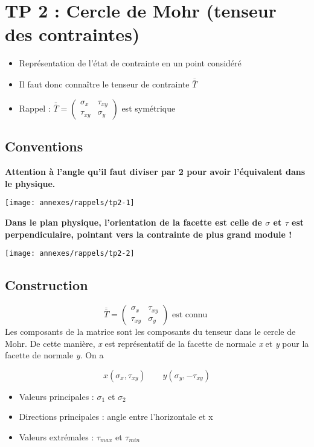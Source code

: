 
\section*{TP 2 : Cercle de Mohr (tenseur des contraintes)}
\begin{itemize}
	\item Représentation de l'état de contrainte en un point considéré
	\item Il faut donc connaître le tenseur de contrainte $\overline{\overline{T}}$
	\item Rappel : $\overline{\overline{T}} = 
	      \left(	
	      \begin{array}{cc}
	      	\sigma _x  & \tau _{xy} \\ 
	      	\tau _{xy} & \sigma _y  
	      \end{array}
	      \right) $ est symétrique
\end{itemize}

\subsection*{Conventions}
\noindent \textbf{Attention à l'angle qu'il faut diviser par 2 pour avoir l'équivalent dans le physique.}
\begin{center}
	\texttt{[image: annexes/rappels/tp2-1]}
\end{center}

\textbf{Dans le plan physique, l'orientation de la facette est celle de $\sigma$ et $\tau$ est perpendiculaire, pointant vers la contrainte de plus grand module !}
\begin{center}
	\texttt{[image: annexes/rappels/tp2-2]}
\end{center}

\subsection*{Construction}
\begin{equation}
	\overline{\overline{T}} = 
	\left(	
	\begin{array}{cc}
		\sigma _x  & \tau _{xy} \\ 
		\tau _{xy} & \sigma _y  
	\end{array}
	\right) \mbox{ est connu }
\end{equation}
Les composants de la matrice sont les composants du tenseur dans le cercle de Mohr. De cette manière, \textit{x} est représentatif de la facette de normale \textit{x} et \textit{y} pour la facette de normale \textit{y}. On a

\begin{equation}
	x(\sigma _x , \tau _{xy}) \qquad y(\sigma _y, - \tau _{xy})
\end{equation}

\begin{itemize}
	\item Valeurs principales : $\sigma _1$ et $\sigma _2$
	\item Directions principales : angle entre l'horizontale et x
	\item Valeurs extrémales : $\tau _{max}$ et $\tau _{min}$
\end{itemize}